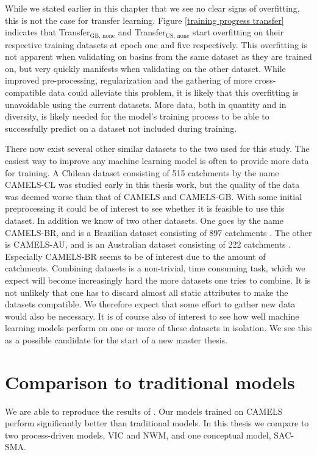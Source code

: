 While we stated earlier in this chapter that we see no clear signs of overfitting, this is not 
the case for transfer learning. Figure 
\ref{training progress transfer} indicates that Transfer$_\text{GB, none}$ 
and Transfer$_\text{US, none}$ start overfitting on their respective training 
datasets at epoch one and five respectively. This overfitting is not apparent when
validating on basins from the 
same dataset as they are trained on, but very quickly manifests when validating 
on the other dataset. While improved pre-processing, regularization and the gathering 
of more  cross-compatible data could alleviate this problem, it is likely that this 
overfitting is 
unavoidable using the current datasets. More data, both in quantity and in 
diversity, is likely needed for the model's training process to be able to 
successfully predict on a dataset not included during training.

There now exist several other similar datasets to the two used for this study. 
The easiest way to improve 
any machine learning model is often to provide more data for training. A Chilean 
dataset consisting of 515 catchments by the name CAMELS-CL \citep{CAMELS_CL} 
was studied early in this thesis work, but the quality 
of the data was deemed worse than that of CAMELS and CAMELS-GB. With some initial 
preprocessing it could be of interest to see whether it is feasible to use this 
dataset.
In addition we know of two other datasets. One goes by the name CAMELS-BR, and is 
a Brazilian dataset consisting of 897 catchments \citep{CAMELS_BR}.
The other is CAMELS-AU, and is an Australian dataset consisting of 222 catchments
 \citep{CAMELS_AU}. Especially CAMELS-BR seems to be of interest due to the 
amount of catchments. Combining datasets is a non-trivial, time consuming task, which 
we expect will become increasingly hard the more datasets one tries to combine. 
It is not unlikely that one has to discard almost all static attributes to make 
the datasets compatible. We therefore expect that some effort to gather new data 
would also be necessary. It is of course also of interest to see how well machine 
learning models perform on one or more of these datasets in isolation. 
We see this as a possible candidate for the start of a new master thesis.
\section{Comparison to traditional models}
We are able to reproduce the results of \citet{lstm_second_paper,lstm_third_paper}. 
Our models 
trained on CAMELS perform significantly better than traditional models. In this 
thesis we compare to two process-driven models, VIC and NWM, and one conceptual 
model, SAC-SMA. 

